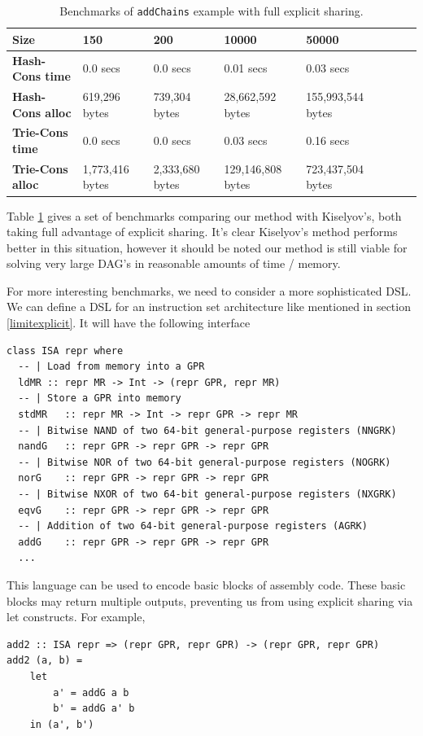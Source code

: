 \documentclass[runningheads]{llncs}
\begin{document}
\begin{table}
  \begin{tabular}{|l|l|l|l|l|l|l|l|}
    \hline
    {\bf Size } &  150 & 200 & 10000 & 50000 \\
    \hline
    {\bf Hash-Cons time } &  0.0 secs & 0.0 secs & 0.01 secs & 0.03 secs \\
    {\bf Hash-Cons alloc } &  619,296 bytes & 739,304 bytes & 28,662,592 bytes & 155,993,544 bytes \\
    {\bf Trie-Cons time } &   0.0 secs & 0.0 secs & 0.03 secs & 0.16 secs \\
    {\bf Trie-Cons alloc } &  1,773,416 bytes & 2,333,680 bytes & 129,146,808 bytes & 723,437,504 bytes \\
    \hline
  \end{tabular}

  \vspace{1mm}
  \caption{Benchmarks of \texttt{addChains} example with full
    explicit sharing.}\label{tab1}
\end{table}

Table \ref{tab1} gives a set of benchmarks comparing our method with Kiselyov's,
both taking full advantage of explicit sharing. It's clear Kiselyov's method
performs better in this situation, however it should be noted our method is
still viable for solving very large DAG's in reasonable amounts of time / memory.

For more interesting benchmarks, we need to consider a more sophisticated DSL.
We can define a DSL for an instruction set architecture like mentioned in
section \ref{limitexplicit}. It will have the following interface

\begin{verbatim}
class ISA repr where
  -- | Load from memory into a GPR
  ldMR :: repr MR -> Int -> (repr GPR, repr MR)
  -- | Store a GPR into memory
  stdMR   :: repr MR -> Int -> repr GPR -> repr MR
  -- | Bitwise NAND of two 64-bit general-purpose registers (NNGRK)
  nandG   :: repr GPR -> repr GPR -> repr GPR
  -- | Bitwise NOR of two 64-bit general-purpose registers (NOGRK)
  norG    :: repr GPR -> repr GPR -> repr GPR
  -- | Bitwise NXOR of two 64-bit general-purpose registers (NXGRK)
  eqvG    :: repr GPR -> repr GPR -> repr GPR
  -- | Addition of two 64-bit general-purpose registers (AGRK)
  addG    :: repr GPR -> repr GPR -> repr GPR
  ...
\end{verbatim}

This language can be used to encode basic blocks of assembly code. These basic
blocks may return multiple outputs, preventing us from using explicit sharing
via let constructs. For example,
\begin{verbatim}
add2 :: ISA repr => (repr GPR, repr GPR) -> (repr GPR, repr GPR)
add2 (a, b) =
    let
        a' = addG a b
        b' = addG a' b
    in (a', b')
\end{verbatim}
\end{document}
